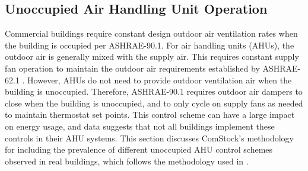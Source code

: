 
\pagebreak
\subsection{Unoccupied Air Handling Unit Operation}
\label{sec:unoccupied_ahu_operation}

Commercial buildings require constant design outdoor air ventilation rates when the building is occupied per ASHRAE-90.1. For air handling units (AHUs), the outdoor air is generally mixed with the supply air. This requires constant supply fan operation to maintain the outdoor air requirements established by ASHRAE-62.1 \citep{ashrae_62.1_2004}. However, AHUs do not need to provide outdoor ventilation air when the building is unoccupied. Therefore, ASHRAE-90.1 requires outdoor air dampers to close when the building is unoccupied, and to only cycle on supply fans as needed to maintain thermostat set points. This control scheme can have a large impact on energy usage, and data suggests that not all buildings implement these controls in their AHU systems. This section discusses ComStock's methodology for including the prevalence of different unoccupied AHU control schemes observed in real buildings, which follows the methodology used in \cite{unocc_hvac_paper}.

